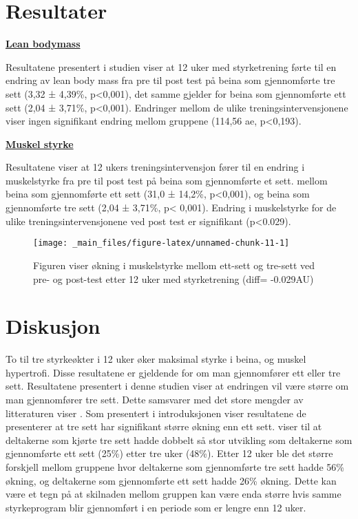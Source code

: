 \documentclass[
]{book}
\begin{document}
\hypertarget{resultater-2}{%
\section{Resultater}\label{resultater-2}}

\underline{\textbf{Lean bodymass}}

Resultatene presentert i studien viser at 12 uker med styrketrening førte til en endring av lean body mass fra pre til post test på beina som gjennomførte tre sett (3,32 ± 4,39\%, p\textless0,001), det samme gjelder for beina som gjennomførte ett sett (2,04 ± 3,71\%, p\textless0,001). Endringer mellom de ulike treningsintervensjonene viser ingen signifikant endring mellom gruppene (114,56 ae, p\textless0,193).

\underline{\textbf{Muskel styrke}}

Resultatene viser at 12 ukers treningsintervensjon fører til en endring i muskelstyrke fra pre til post test på beina som gjennomførte et sett. mellom beina som gjennomførte ett sett (31,0 ± 14,2\%, p\textless0,001), og beina som gjennomførte tre sett (2,04 ± 3,71\%, p\textless{} 0,001). Endring i muskelstyrke for de ulike treningsintervensjonene ved post test er signifikant (p\textless0.029).

\begin{figure}
\texttt{[image: \_main\_files/figure-latex/unnamed-chunk-11-1]} \caption{Figuren viser økning i muskelstyrke mellom ett-sett og tre-sett ved pre- og post-test etter 12 uker med styrketrening (diff= -0.029AU)}\label{fig:unnamed-chunk-11}
\end{figure}

\hypertarget{diskusjon-2}{%
\section{Diskusjon}\label{diskusjon-2}}

To til tre styrkeøkter i 12 uker øker maksimal styrke i beina, og muskel hypertrofi. Disse resultatene er gjeldende for om man gjennomfører ett eller tre sett. Resultatene presentert i denne studien viser at endringen vil være større om man gjennomfører tre sett. Dette samsvarer med det store mengder av litteraturen viser \citep{rhea2002, munn2005, fröhlich2010}. Som presentert i introduksjonen viser resultatene de presenterer at tre sett har signifikant større økning enn ett sett. \citep[Rhea][]{rhea2002} viser til at deltakerne som kjørte tre sett hadde dobbelt så stor utvikling som deltakerne som gjennomførte ett sett (25\%) etter tre uker (48\%). Etter 12 uker ble det større forskjell mellom gruppene hvor deltakerne som gjennomførte tre sett hadde 56\% økning, og deltakerne som gjennomførte ett sett hadde 26\% økning. Dette kan være et tegn på at skilnaden mellom gruppen kan være enda større hvis samme styrkeprogram blir gjennomført i en periode som er lengre enn 12 uker.
\end{document}

